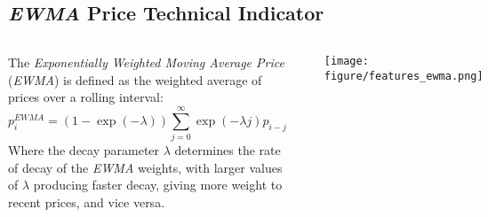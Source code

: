 \documentclass[10pt]{beamer}\usepackage[]{graphicx}\usepackage[]{color}
\makeatletter
\newenvironment{kframe}{%
 \def\at@end@of@kframe{}%
 \ifinner\ifhmode%
  \def\at@end@of@kframe{\end{minipage}}%
  \begin{minipage}{\columnwidth}%
 \fi\fi%
 \def\FrameCommand##1{\hskip\@totalleftmargin \hskip-\fboxsep
 \colorbox{shadecolor}{##1}\hskip-\fboxsep
     \hskip-\linewidth \hskip-\@totalleftmargin \hskip\columnwidth}%
 \MakeFramed {\advance\hsize-\width
   \@totalleftmargin\z@ \linewidth\hsize
   \@setminipage}}%
 {\par\unskip\endMakeFramed%
 \at@end@of@kframe}
\newenvironment{knitrout}{}{} %
\makeatother
\begin{document}
\subsection{\protect\emph{EWMA} Price Technical Indicator}
\begin{frame}[fragile,t]{\subsecname}
\vspace{-1em}
\begin{block}{}
  \begin{columns}[T]
      The \emph{Exponentially Weighted Moving Average Price} (\emph{EWMA}) is defined as the weighted average of prices over a rolling interval:
      {\scriptsize
      \begin{displaymath}
        p^{EWMA}_i = (1-\exp(-\lambda)) \sum_{j=0}^{\infty} \exp(-\lambda j) p_{i-j}
      \end{displaymath}
      }
      Where the decay parameter $\lambda$ determines the rate of decay of the \emph{EWMA} weights, with larger values of $\lambda$ producing faster decay, giving more weight to recent prices, and vice versa.
\begin{knitrout}\tiny
{}\color{fgcolor}\begin{kframe}
\begin{verbatim}
> # Extract log VTI prices
> clos_e <- log(na.omit(rutils::etf_env$price_s$VTI))
> n_rows <- NROW(clos_e)
> # Calculate EWMA weights
> look_back <- 21
> lamb_da <- 0.1
> weight_s <- exp(lamb_da*1:look_back)
> weight_s <- weight_s/sum(weight_s)
> # Calculate EWMA prices
> ew_ma <- roll::roll_sum(clos_e, width=look_back, weights=weight_s, min_obs=1)
> # Copy over NA values
> ew_ma <- zoo::na.locf(ew_ma, fromLast=TRUE)
> price_s <- cbind(clos_e, ew_ma)
> colnames(price_s) <- c("VTI", "VTI EWMA")
\end{verbatim}
\end{kframe}
\end{knitrout}
      \vspace{-1em}
      \texttt{[image: figure/features\_ewma.png]}
\begin{knitrout}\tiny
{}\color{fgcolor}\begin{kframe}
\begin{verbatim}
> # Dygraphs plot with custom line colors
> col_ors <- c("blue", "red")
> dygraphs::dygraph(price_s["2009"], main="VTI EWMA Prices") %>%
+   dyOptions(colors=col_ors, strokeWidth=2)
> # Plot EWMA prices with custom line colors
> x11(width=6, height=5)
> plot_theme <- chart_theme()
> plot_theme$col$line.col <- col_ors
> quantmod::chart_Series(price_s["2009"], theme=plot_theme,
+        lwd=2, name="VTI EWMA Prices")
> legend("bottomright", legend=colnames(price_s),
+  inset=0.1, bg="white", lty=1, lwd=6, cex=0.8,
+  col=plot_theme$col$line.col, bty="n")
\end{verbatim}
\end{kframe}
\end{knitrout}
  \end{columns}
\end{block}

\end{frame}
\end{document}
